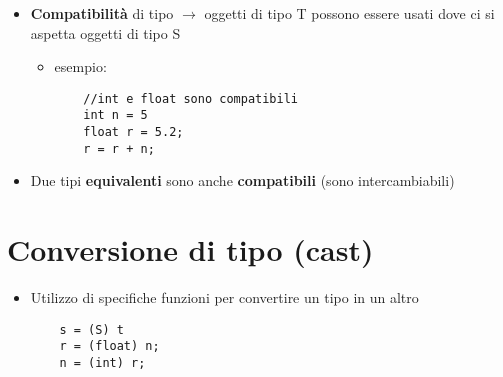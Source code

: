 \documentclass{article}
\begin{document}
\begin{flushleft}
\begin{itemize}
  \item \textbf{Compatibilità} di tipo $\rightarrow$ oggetti di tipo T possono essere usati dove ci si aspetta oggetti di tipo S
  \begin{itemize}
  \item esempio:
  \begin{lstlisting}
    //int e float sono compatibili
    int n = 5
    float r = 5.2;
    r = r + n;
  \end{lstlisting}
  \end{itemize}
  \item Due tipi \textbf{equivalenti} sono anche \textbf{compatibili} (sono intercambiabili)
\end{itemize}

\section*{Conversione di tipo (cast)}
\begin{itemize}
  \item Utilizzo di specifiche funzioni per convertire un tipo in un altro
  \begin{lstlisting}
    s = (S) t
    r = (float) n;
    n = (int) r;
  \end{lstlisting}
\end{itemize}


\end{flushleft}
\end{document}
